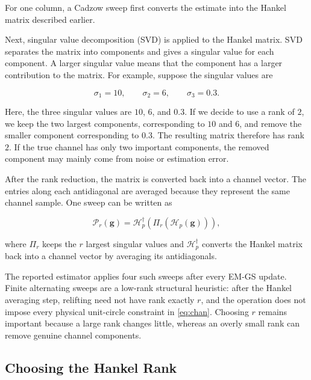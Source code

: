 \documentclass[journal]{IEEEtran}
\newcommand{\bg}{\mathbf{g}}
\newcommand{\Hank}{\mathcal{H}}
\begin{document}
For one column, a Cadzow sweep first converts the estimate into the Hankel
matrix described earlier.

Next, singular value decomposition (SVD) is applied to the Hankel matrix.
SVD separates the matrix into components and gives a singular value for
each component. A larger singular value means that the component has a
larger contribution to the matrix. For example, suppose the singular
values are

\begin{equation}
\sigma_1=10,
\qquad
\sigma_2=6,
\qquad
\sigma_3=0.3.
\end{equation}

Here, the three singular values are $10$, $6$, and $0.3$. If we decide to
use a rank of $2$, we keep the two largest components, corresponding to
$10$ and $6$, and remove the smaller component corresponding to $0.3$.
The resulting matrix therefore has rank $2$. If the true channel has only
two important components, the removed component may mainly come from noise
or estimation error.

After the rank reduction, the matrix is converted back into a channel
vector. The entries along each antidiagonal are averaged because they
represent the same channel sample. One sweep can be written as

\begin{equation}
\mathcal{P}_r(\bg)
=
\Hank_p^{\dagger}
\left(
\Pi_r(\Hank_p(\bg))
\right),
\end{equation}

where $\Pi_r$ keeps the $r$ largest singular values and
$\Hank_p^{\dagger}$ converts the Hankel matrix back into a channel vector
by averaging its antidiagonals.

The reported estimator applies four such sweeps after every EM-GS update.
Finite alternating sweeps are a low-rank structural heuristic: after the
Hankel averaging step, relifting need not have rank exactly $r$, and the
operation does not impose every physical unit-circle constraint in
\eqref{eq:chan}. Choosing $r$ remains important because a large rank changes
little, whereas an overly small rank can remove genuine channel components.

\subsection{Choosing the Hankel Rank}
\end{document}
